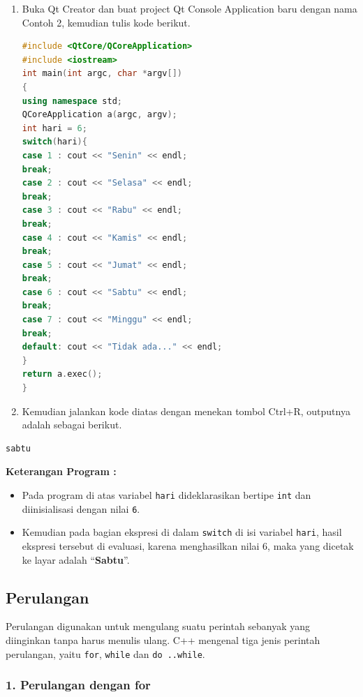 \begin{enumerate}
\def\labelenumi{\arabic{enumi}.}
\item
  Buka Qt Creator dan buat project Qt Console Application baru dengan
  nama Contoh 2, kemudian tulis kode berikut.

\begin{lstlisting}[language=c++]
#include <QtCore/QCoreApplication>
#include <iostream>
int main(int argc, char *argv[])
{
using namespace std;
QCoreApplication a(argc, argv);
int hari = 6;
switch(hari){
case 1 : cout << "Senin" << endl;
break;
case 2 : cout << "Selasa" << endl;
break;
case 3 : cout << "Rabu" << endl;
break;
case 4 : cout << "Kamis" << endl;
break;
case 5 : cout << "Jumat" << endl;
break;
case 6 : cout << "Sabtu" << endl;
break;
case 7 : cout << "Minggu" << endl;
break;
default: cout << "Tidak ada..." << endl;
}
return a.exec();
}
\end{lstlisting}
\item
  Kemudian jalankan kode diatas dengan menekan tombol Ctrl+R, outputnya
  adalah sebagai berikut.
\end{enumerate}

\begin{verbatim}
sabtu
\end{verbatim}

\textbf{Keterangan Program :}

\begin{itemize}
\tightlist
\item
  Pada program di atas variabel \texttt{hari} dideklarasikan bertipe
  \texttt{int} dan diinisialisasi dengan nilai \texttt{6}.
\item
  Kemudian pada bagian ekspresi di dalam \texttt{switch} di isi variabel
  \texttt{hari}, hasil ekspresi tersebut di evaluasi, karena
  menghasilkan nilai 6, maka yang dicetak ke layar adalah
  ``\textbf{Sabtu}''.
\end{itemize}

\subsection{Perulangan}\label{b.-perulangan}

Perulangan digunakan untuk mengulang suatu perintah sebanyak yang
diinginkan tanpa harus menulis ulang. C++ mengenal tiga jenis perintah
perulangan, yaitu \texttt{for}, \texttt{while} dan \texttt{do\ ..while}.

\subsubsection{1. Perulangan dengan for}\label{perulangan-dengan-for}

